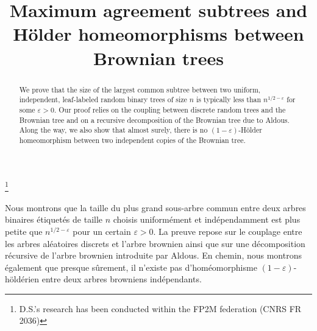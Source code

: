 \documentclass[JEP,XML,SOM,Unicode,NoFloatCountersInSection,published]{cedram}
\theoremstyle{plain}
\theoremstyle{definition}
\begin{document}
\frontmatter

\title{Maximum agreement subtrees and Hölder homeomorphisms between Brownian trees}

\author[\initial{T.} \lastname{Budzinski}]{ }
\address{ENS de Lyon, UMPA UMR 5669 CNRS,\\
46 allée d’Italie, 69364 Lyon Cedex 07, France}

\author[\initial{D.} \lastname{Sénizergues}]{ }
\address{MODAL'X, UPL, Univ. Paris Nanterre, CNRS,\\
F-92000 Nanterre, France}

\thanks{D.S.'s research has been conducted within the FP2M federation (CNRS FR 2036)}

\begin{abstract}
We prove that the size of the largest common subtree between two uniform, independent, leaf-labeled random binary trees of size $n$ is typically less than $n^{1/2-\varepsilon}$ for some $\varepsilon>0$. Our proof relies on the coupling between discrete random trees and the Brownian tree and on a recursive decomposition of the Brownian tree due to Aldous. Along the way, we also show that almost surely, there is no $(1-\varepsilon)$-Hölder homeomorphism between two independent copies of the Brownian tree.
\end{abstract}





\begin{altabstract}
Nous montrons que la taille du plus grand sous-arbre commun entre deux arbres binaires étiquetés de taille $n$ choisis uniformément et indépendamment est plus petite que $n^{1/2-\varepsilon}$ pour un certain $\varepsilon>0$. La preuve repose sur le couplage entre les arbres aléatoires discrets et l'arbre brownien ainsi que sur une décomposition récursive de l'arbre brownien introduite par Aldous. En chemin, nous montrons également que presque sûrement, il n'existe pas d'homéomorphisme $(1-\varepsilon)$-höldérien entre deux arbres browniens indépendants.
\end{altabstract}
\end{document}
